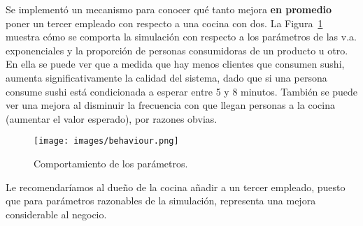 \documentclass[a4paper, 10pt]{article}
\begin{document}
	Se implementó un mecanismo para conocer qué tanto mejora {\bfseries en promedio} poner un tercer empleado con respecto a
	una cocina con dos. La Figura~\ref{fig:3} muestra cómo se comporta la simulación con respecto a los parámetros de las
	v.a. exponenciales y la proporción de personas consumidoras de un producto u otro. En ella se puede ver que a medida
	que hay menos clientes que consumen sushi, aumenta significativamente la calidad del sistema, dado que si una persona
	consume sushi está condicionada a esperar entre 5 y 8 minutos. También se puede ver una mejora al disminuir la frecuencia
	con que llegan personas a la cocina (aumentar el valor esperado), por razones obvias.

	\begin{figure}[h]
		\centering
		\texttt{[image: images/behaviour.png]}			
		\caption{Comportamiento de los parámetros.}
		\label{fig:3}	
	\end{figure}

	Le recomendaríamos al dueño de la cocina añadir a un tercer empleado, puesto que para parámetros razonables de la simulación,
	representa una mejora considerable al negocio.
\end{document}
